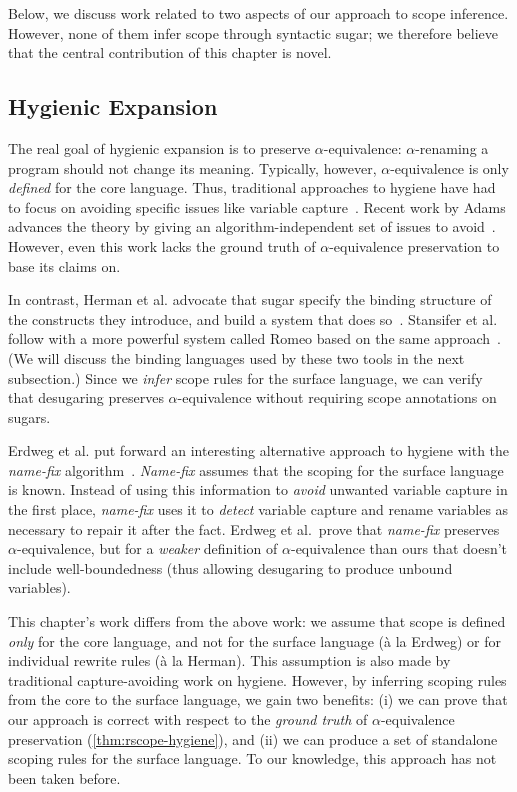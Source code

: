 Below, we discuss work related to two aspects of our approach to
scope inference. However, none of them infer scope through syntactic
sugar; we therefore believe that the central contribution of this
chapter is novel.

\subsection{Hygienic Expansion}

The real goal of hygienic expansion is to preserve
$\alpha$-equivalence: $\alpha$-renaming a program should not change
its meaning. Typically, however, $\alpha$-equivalence is only
\emph{defined} for the core language. Thus, traditional approaches to
hygiene have had to focus on avoiding specific issues like
variable capture~\cite{hygienic-macros}.
Recent work by Adams advances the theory by
giving an algorithm-independent set of issues to
avoid~\cite{adams-hygiene}. However, even this work lacks the ground truth of
$\alpha$-equivalence preservation to base its claims on.

In contrast, Herman et al.
advocate that sugar specify the binding structure of the constructs
they introduce, and build a system that does so~\cite{herman-hygiene}.
Stansifer et al. follow with a more powerful system
called Romeo based on the same approach~\cite{stansifer-romeo}.
(We will discuss the binding languages used by these two tools in the
next subsection.)
Since we \emph{infer} scope rules for the surface language, we can
verify that desugaring preserves $\alpha$-equivalence without
requiring scope annotations on sugars.

Erdweg et al. put forward an interesting alternative approach to hygiene
with the \emph{name-fix} algorithm~\cite{erdweg-hygiene}.
\emph{Name-fix} assumes that the scoping for the surface language is
known. Instead of using this information to \emph{avoid} unwanted
variable capture in the first place, \emph{name-fix} uses it
to \emph{detect} variable capture and rename variables as necessary to
repair it after the fact. Erdweg et al.\ prove that \emph{name-fix}
preserves $\alpha$-equivalence, but for a \emph{weaker} definition
of $\alpha$-equivalence than ours that doesn't include
well-boundedness (thus allowing desugaring to produce unbound variables).

This chapter's work differs from the above work: we assume that scope is defined
\emph{only} for the core language, and not for the
surface language (\`a la Erdweg) or for individual rewrite rules (\`a la Herman).
This assumption is also made by traditional capture-avoiding work on
hygiene. However, by inferring scoping rules from the core to
the surface language, we gain two benefits: (i) we can prove that our
approach is correct with respect to the \emph{ground truth} of
$\alpha$-equivalence preservation (\cref{thm:rscope-hygiene}), and (ii)
we can produce a set of standalone scoping rules for the surface
language. To our knowledge, this approach has not been taken before.


